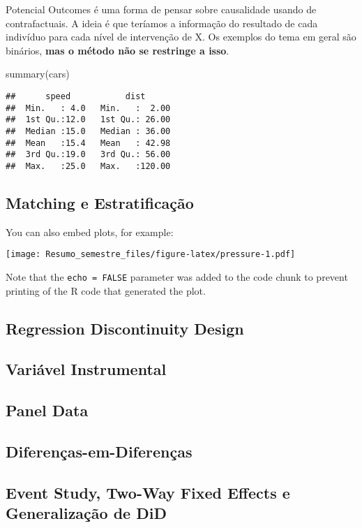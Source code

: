 \documentclass[
]{article}
\newenvironment{Shaded}{\begin{snugshade}}{\end{snugshade}}
\newcommand{\FunctionTok}[1]{\textcolor[rgb]{0.00,0.00,0.00}{#1}}
\newcommand{\NormalTok}[1]{#1}
\begin{document}
Potencial Outcomes é uma forma de pensar sobre causalidade usando de
contrafactuais. A ideia é que teríamos a informação do resultado de cada
indivíduo para cada nível de intervenção de X. Os exemplos do tema em
geral são binários, \textbf{mas o método não se restringe a isso}.

\begin{Shaded}
\begin{Highlighting}[]
\FunctionTok{summary}\NormalTok{(cars)}
\end{Highlighting}
\end{Shaded}

\begin{verbatim}
##      speed           dist       
##  Min.   : 4.0   Min.   :  2.00  
##  1st Qu.:12.0   1st Qu.: 26.00  
##  Median :15.0   Median : 36.00  
##  Mean   :15.4   Mean   : 42.98  
##  3rd Qu.:19.0   3rd Qu.: 56.00  
##  Max.   :25.0   Max.   :120.00
\end{verbatim}

\hypertarget{matching-e-estratificauxe7uxe3o}{%
\subsection{Matching e
Estratificação}\label{matching-e-estratificauxe7uxe3o}}

You can also embed plots, for example:

\texttt{[image: Resumo\_semestre\_files/figure-latex/pressure-1.pdf]}

Note that the \texttt{echo\ =\ FALSE} parameter was added to the code
chunk to prevent printing of the R code that generated the plot.

\hypertarget{regression-discontinuity-design}{%
\subsection{Regression Discontinuity
Design}\label{regression-discontinuity-design}}

\hypertarget{variuxe1vel-instrumental}{%
\subsection{Variável Instrumental}\label{variuxe1vel-instrumental}}

\hypertarget{panel-data}{%
\subsection{Panel Data}\label{panel-data}}

\hypertarget{diferenuxe7as-em-diferenuxe7as}{%
\subsection{Diferenças-em-Diferenças}\label{diferenuxe7as-em-diferenuxe7as}}

\hypertarget{event-study-two-way-fixed-effects-e-generalizauxe7uxe3o-de-did}{%
\subsection{Event Study, Two-Way Fixed Effects e Generalização de
DiD}\label{event-study-two-way-fixed-effects-e-generalizauxe7uxe3o-de-did}}
\end{document}
